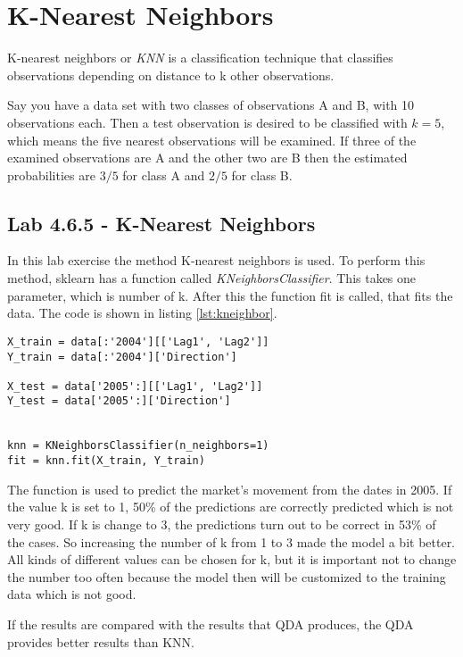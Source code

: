 \section{K-Nearest Neighbors}
K-nearest neighbors or \emph{KNN} is a classification technique that classifies observations depending on distance to k other observations. 

Say you have a  data set with two classes of observations A and B, with 10 observations each. Then a test observation is desired to be classified with $k=5$, which means the five nearest observations will be examined. If three of the examined observations are A and the other two are B then the estimated probabilities are $3/5$ for class A and $2/5$ for class B. 

\subsection{Lab 4.6.5 - K-Nearest Neighbors}

In this lab exercise the method K-nearest neighbors is used. To perform this method, sklearn has a function called \emph{KNeighborsClassifier}. This takes one parameter, which is number of k. After this the function fit is called, that fits the data.
The code is shown in listing \ref{lst:kneighbor}.

\begin{lstlisting}[caption={Python KNN function, where k is set to 1}, label=lst:kneighbor, mathescape=true]
X_train = data[:'2004'][['Lag1', 'Lag2']]
Y_train = data[:'2004']['Direction']

X_test = data['2005':][['Lag1', 'Lag2']]
Y_test = data['2005':]['Direction']


knn = KNeighborsClassifier(n_neighbors=1)
fit = knn.fit(X_train, Y_train)
\end{lstlisting}

The function is used to predict the market's movement from the dates in 2005. If the value k is set to 1, 50\% of the predictions are correctly predicted which is not very good.
If k is change to 3, the predictions turn out to be correct in 53\% of the cases. So increasing the number of k from 1 to 3 made the model a bit better. All kinds of different values can be chosen for k, but it is important not to change the number too often because the model then will be customized to the training data which is not good.

If the results are compared with the results that QDA produces, the QDA provides better results than KNN.